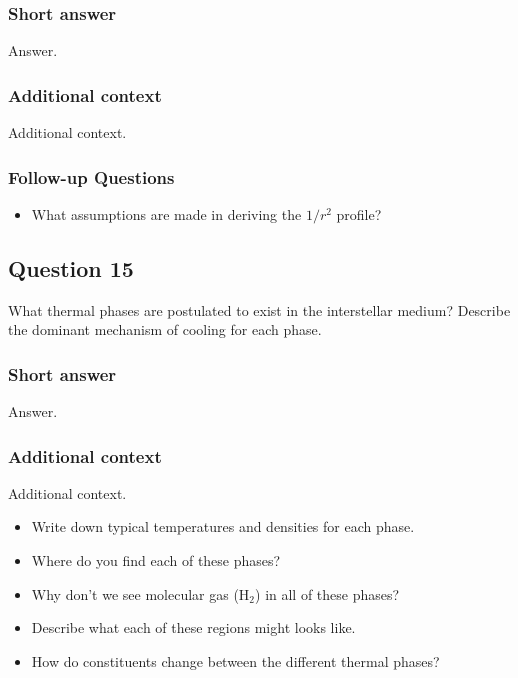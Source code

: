 \documentclass[a4paper,10pt]{article}
\begin{document}
\subsubsection{Short answer}

Answer.

\subsubsection{Additional context}

Additional context.

\subsubsection{Follow-up Questions}

\begin{itemize}
    \item What assumptions are made in deriving the $1/r^2$ profile?
\end{itemize}


\newpage
\subsection{Question 15}

What thermal phases are postulated to exist in the interstellar medium? Describe the dominant mechanism of cooling for each phase.

\subsubsection{Short answer}

Answer.

\subsubsection{Additional context}

Additional context.

\begin{itemize}
    \item Write down typical temperatures and densities for each phase.
    \item Where do you find each of these phases?
    \item Why don't we see molecular gas (H$_2$) in all of these phases?
    \item Describe what each of these regions might looks like.
    \item How do constituents change between the different thermal phases?
\end{itemize}
\end{document}
